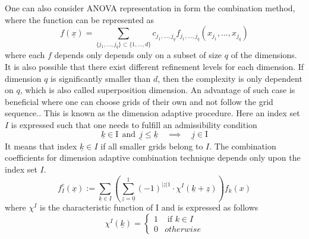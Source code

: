One can also consider ANOVA representation in form the combination method, where the function can be represented as
\begin{equation}
	f(\underline{x}) = \sum_{\{j_1,...,j_q\}\subset\{1,...,d\}} c_{j_1,...,j_q} f_{j_1,...,j_q} \left( x_{j_1},...,x_{j_q} \right)
\end{equation}
where each $f$ depends only depends only on a subset of size $q$ of the dimensions. It is also possible that there exist different refinement levels for each dimension. If dimension $q$ is significantly smaller than $d$, then the complexity is only dependent on $q$, which is also called superposition dimension. An advantage of such case is beneficial where one can choose grids of their own and not follow the grid sequence.. This is known as the dimension adaptive procedure. Here an index set $I$ is expressed such that one needs to fulfill an admissibility condition
\begin{equation}
	\underline{k} \in \text{I} \ \ \text{and} \ \ \underline{j}\le \underline{k} \quad \implies \quad \underline{j}\in \text{I}
\end{equation}
It means that index $\underline{k} \in I$ if all smaller grids belong to $I$. The combination coefficients for dimension adaptive combination technique depends only upon the index set $I$. 
\begin{equation}
    f_I^c\left(\underline{x}\right) := \sum\limits_{\underline{k} \in I}\left( \sum\limits_{\underline{z} = \underline{0}}^{1}\left(-1\right)^{\left|\underline{z}\right|1}\cdot \chi^{I}\left(\underline{k}+\underline{z}\right)\right)f_{k}\left(x\right)
\end{equation}
where $\chi^{I}$ is the characteristic function of I and is expressed as follows
\begin{equation}
     \chi^{I}(\underline{k}) =
     \begin{cases}
        1 &  \text{ if } k \in I\\
        0 & otherwise 
     \end{cases}
\end{equation}

